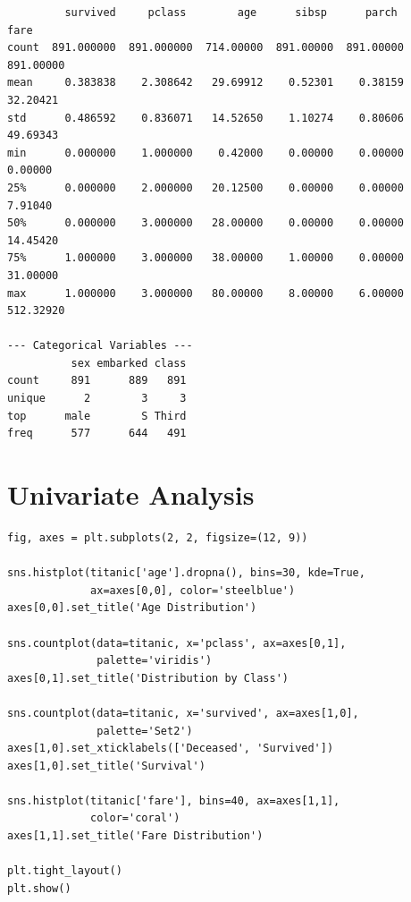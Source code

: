 \begin{codeoutput}
\begin{verbatim}
         survived     pclass        age      sibsp      parch       fare
count  891.000000  891.000000  714.00000  891.00000  891.00000  891.00000
mean     0.383838    2.308642   29.69912    0.52301    0.38159   32.20421
std      0.486592    0.836071   14.52650    1.10274    0.80606   49.69343
min      0.000000    1.000000    0.42000    0.00000    0.00000    0.00000
25%      0.000000    2.000000   20.12500    0.00000    0.00000    7.91040
50%      0.000000    3.000000   28.00000    0.00000    0.00000   14.45420
75%      1.000000    3.000000   38.00000    1.00000    0.00000   31.00000
max      1.000000    3.000000   80.00000    8.00000    6.00000  512.32920

--- Categorical Variables ---
          sex embarked class
count     891      889   891
unique      2        3     3
top      male        S Third
freq      577      644   491
\end{verbatim}
\end{codeoutput}

\section{Univariate Analysis}

\begin{codeblock}[title=\textbf{Python}]
\begin{verbatim}
fig, axes = plt.subplots(2, 2, figsize=(12, 9))

sns.histplot(titanic['age'].dropna(), bins=30, kde=True,
             ax=axes[0,0], color='steelblue')
axes[0,0].set_title('Age Distribution')

sns.countplot(data=titanic, x='pclass', ax=axes[0,1],
              palette='viridis')
axes[0,1].set_title('Distribution by Class')

sns.countplot(data=titanic, x='survived', ax=axes[1,0],
              palette='Set2')
axes[1,0].set_xticklabels(['Deceased', 'Survived'])
axes[1,0].set_title('Survival')

sns.histplot(titanic['fare'], bins=40, ax=axes[1,1],
             color='coral')
axes[1,1].set_title('Fare Distribution')

plt.tight_layout()
plt.show()
\end{verbatim}
\end{codeblock}

